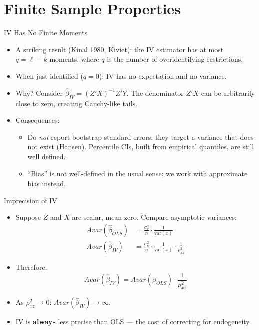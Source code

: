 \documentclass[aspectratio=169, handout]{beamer}
\numberwithin{equation}{section}
\begin{document}
\section{Finite Sample Properties}

\begin{frame}{IV Has No Finite Moments}
\begin{itemize}
\item A striking result (Kinal 1980, Kiviet): the IV estimator has at most $q=\ell-k$ moments, where $q$ is the number of overidentifying restrictions.
\item When just identified ($q=0$): IV has \alert{no expectation} and \alert{no variance}.
\item Why?  Consider $\hat{\beta}_{IV}=(Z'X)^{-1}Z'Y$.  The denominator $Z'X$ can be arbitrarily close to zero, creating Cauchy-like tails.
\item Consequences:
\begin{itemize}
\item Do \emph{not} report bootstrap standard errors: they target a variance that does not exist (Hansen).  Percentile CIs, built from empirical quantiles, are still well defined.
\item ``Bias'' is not well-defined in the usual sense; we work with approximate bias instead.
\end{itemize}
\end{itemize}
\end{frame}


\begin{frame}{Imprecision of IV}
\begin{itemize}
\item Suppose $Z$ and $X$ are scalar, mean zero. Compare asymptotic variances:
\begin{align*}
Avar(\hat{\beta}_{OLS})&=\frac{\sigma_e^2}{n}\cdot\frac{1}{\text{var}(x)}\\[6pt]
Avar(\hat{\beta}_{IV})&=\frac{\sigma_e^2}{n}\cdot\frac{1}{\text{var}(x)}\cdot\frac{1}{\rho^2_{xz}}
\end{align*}
\item Therefore:
$$\boxed{Avar(\hat{\beta}_{IV})=Avar(\hat{\beta}_{OLS})\cdot\frac{1}{\rho^2_{xz}}}$$
\item As $\rho^2_{xz}\rightarrow 0$: $Avar(\hat{\beta}_{IV})\rightarrow \infty$.
\item IV is \textbf{always} less precise than OLS --- the cost of correcting for endogeneity.
\end{itemize}
\end{frame}
\end{document}
